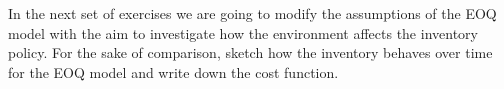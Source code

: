 \begin{exercise}
  In the next set of exercises we are going to modify the assumptions
  of the EOQ model with the aim to investigate how the environment
  affects the inventory policy. For the sake of comparison, sketch how the inventory behaves over time for the EOQ model and write down the cost function.

\end{exercise}

